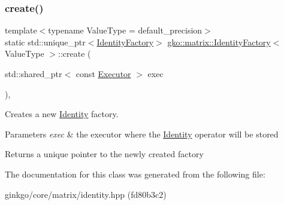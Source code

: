 \subsubsection{\texorpdfstring{create()}{create()}}
{\footnotesize\ttfamily template$<$typename Value\+Type  = default\+\_\+precision$>$ \\
static std\+::unique\+\_\+ptr$<$\hyperlink{classgko_1_1matrix_1_1IdentityFactory}{Identity\+Factory}$>$ \hyperlink{classgko_1_1matrix_1_1IdentityFactory}{gko\+::matrix\+::\+Identity\+Factory}$<$ Value\+Type $>$\+::create (\begin{DoxyParamCaption}\item[{std\+::shared\+\_\+ptr$<$ const \hyperlink{classgko_1_1Executor}{Executor} $>$}]{exec }\end{DoxyParamCaption})\hspace{0.3cm}{\ttfamily [inline]}, {\ttfamily [static]}}



Creates a new \hyperlink{classgko_1_1matrix_1_1Identity}{Identity} factory. 


\begin{DoxyParams}{Parameters}
{\em exec} & the executor where the \hyperlink{classgko_1_1matrix_1_1Identity}{Identity} operator will be stored\\
\hline
\end{DoxyParams}
\begin{DoxyReturn}{Returns}
a unique pointer to the newly created factory 
\end{DoxyReturn}


The documentation for this class was generated from the following file\+:\begin{DoxyCompactItemize}
\item 
ginkgo/core/matrix/identity.\+hpp (fd80b3c2)\end{DoxyCompactItemize}
